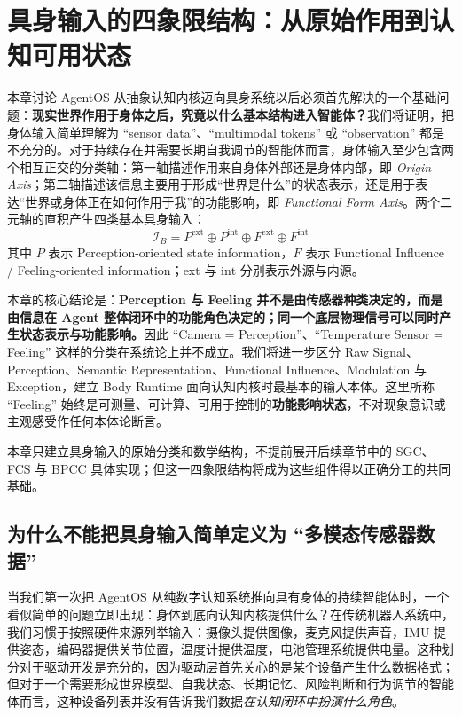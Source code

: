 \chapter{具身输入的四象限结构：从原始作用到认知可用状态}
\label{chap:embodied-input-four-quadrants}

\begin{chapterlead}
本章讨论 AgentOS 从抽象认知内核迈向具身系统以后必须首先解决的一个基础问题：\textbf{现实世界作用于身体之后，究竟以什么基本结构进入智能体？}我们将证明，把身体输入简单理解为 ``sensor data''、``multimodal tokens'' 或 ``observation'' 都是不充分的。对于持续存在并需要长期自我调节的智能体而言，身体输入至少包含两个相互正交的分类轴：第一轴描述作用来自身体外部还是身体内部，即 \emph{Origin Axis}；第二轴描述该信息主要用于形成``世界是什么''的状态表示，还是用于表达``世界或身体正在如何作用于我''的功能影响，即 \emph{Functional Form Axis}。两个二元轴的直积产生四类基本具身输入：
\[
\boxed{
\mathcal I_{B}
=
P^{\mathrm{ext}}
\oplus
P^{\mathrm{int}}
\oplus
F^{\mathrm{ext}}
\oplus
F^{\mathrm{int}}
}
\]
其中 $P$ 表示 Perception-oriented state information，$F$ 表示 Functional Influence / Feeling-oriented information；$\mathrm{ext}$ 与 $\mathrm{int}$ 分别表示外源与内源。

本章的核心结论是：\textbf{Perception 与 Feeling 并不是由传感器种类决定的，而是由信息在 Agent 整体闭环中的功能角色决定的；同一个底层物理信号可以同时产生状态表示与功能影响。}因此 ``Camera = Perception''、``Temperature Sensor = Feeling'' 这样的分类在系统论上并不成立。我们将进一步区分 Raw Signal、Perception、Semantic Representation、Functional Influence、Modulation 与 Exception，建立 Body Runtime 面向认知内核时最基本的输入本体。这里所称 ``Feeling'' 始终是可测量、可计算、可用于控制的\textbf{功能影响状态}，不对现象意识或主观感受作任何本体论断言。

本章只建立具身输入的原始分类和数学结构，不提前展开后续章节中的 SGC、FCS 与 BPCC 具体实现；但这一四象限结构将成为这些组件得以正确分工的共同基础。
\end{chapterlead}

\section{为什么不能把具身输入简单定义为 ``多模态传感器数据''}
\label{sec:why-not-multimodal-sensor-data}

当我们第一次把 AgentOS 从纯数字认知系统推向具有身体的持续智能体时，一个看似简单的问题立即出现：身体到底向认知内核提供什么？在传统机器人系统中，我们习惯于按照硬件来源列举输入：摄像头提供图像，麦克风提供声音，IMU 提供姿态，编码器提供关节位置，温度计提供温度，电池管理系统提供电量。这种划分对于驱动开发是充分的，因为驱动层首先关心的是某个设备产生什么数据格式；但对于一个需要形成世界模型、自我状态、长期记忆、风险判断和行为调节的智能体而言，这种设备列表并没有告诉我们数据\emph{在认知闭环中扮演什么角色}。

